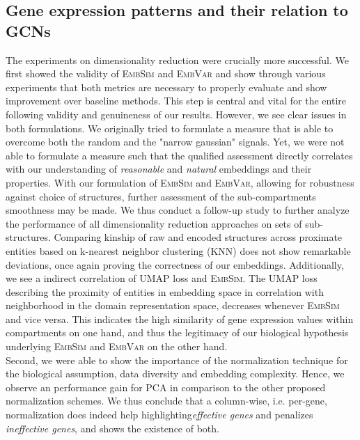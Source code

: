 \documentclass[]{article}
\begin{document}
\subsection{Gene expression patterns and their relation to GCNs}
\label{sec:disc_dimred}
The experiments on dimensionality reduction were crucially more successful. We first showed the validity of \textsc{EmbSim} and \textsc{EmbVar} and show through various experiments that both metrics are necessary to properly evaluate and show improvement over baseline methods. This step is central and vital for the entire following validity and genuineness of our results. However, we see clear issues in both formulations. We originally tried to formulate a measure that is able to overcome both the random and the "narrow gaussian" signals. Yet, we were not able to formulate a measure such that the qualified assessment directly correlates with our understanding of \textit{reasonable} and \textit{natural} embeddings and their properties. With our formulation of \textsc{EmbSim} and \textsc{EmbVar}, allowing for robustness against choice of structures, further assessment of the sub-compartments smoothness may be made. 
We thus conduct a follow-up study to further analyze the performance of all dimensionality reduction approaches on sets of sub-structures. Comparing kinship of raw and encoded structures across proximate entities based on k-nearest neighbor clustering (KNN) does not show remarkable deviations, once again proving the correctness of our embeddings. 
Additionally, we see a indirect correlation of UMAP loss and \textsc{EmbSim}. The UMAP loss describing the proximity of entities in embedding space in correlation with neighborhood in the domain representation space, decreases whenever \textsc{EmbSim} and vice versa. This indicates the high similarity of gene expression values within compartments on one hand, and thus the legitimacy of our biological hypothesis underlying \textsc{EmbSim} and \textsc{EmbVar} on the other hand. \\

Second, we were able to show the importance of the normalization technique for the biological assumption, data diversity and embedding complexity. Hence, we observe an performance gain for PCA in comparison to the other proposed normalization schemes. We thus conclude that a column-wise, i.e. per-gene, normalization does indeed help highlighting\textit{effective genes} and penalizes \textit{ineffective genes}, and shows the existence of both.\\
\end{document}
